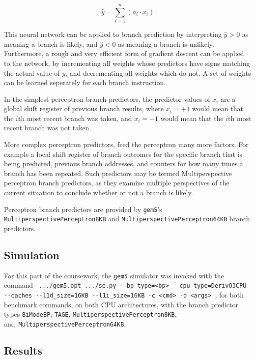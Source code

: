 \begin{equation}
    \hat{y} = \sum_{i=1}^{n} \left( a_i \cdot x_i \right)
    \label{eq:perceptron}
\end{equation}

This neural network can be applied to branch prediction by interpreting
\(\hat{y} > 0\) as meaning a branch is likely, and \(\hat{y} < 0\) as meaning
a branch is unlikely. 
Furthermore, a rough and very efficient form of gradient
descent can be applied to the network, by incrementing all weights whose predictors
have signs matching the actual value of \(y\), and decrementing all weights which
do not. 
A set of weights can be learned seperately for each branch 
instruction.~\cite{Jimenez2001}

In the simplest perceptron branch predictors, the predictor values of \(x_i\)
are a global shift register of previous branch results, where \(x_i = +1\) would
mean that the \(i\)th most recent branch was taken, and \(x_i = -1\) would
mean that the \(i\)th most recent branch was not taken.

More complex perceptron predictors, feed the perceptron many more
factors. For example a local shift register of branch outcomes for the specific
branch that is being predicted, previous branch addresses, and counters for
how many times a branch has been repeated.
Such predictors may be termed
Multiperspective perceptron branch predictors, as they examine multiple
perspectives of the current situation to conclude whether or not a branch
is likely.

Perceptron branch predictors are provided by \texttt{gem5}'s \texttt{MultiperspectivePerceptron8KB}
and \texttt{MultiperspectivePerceptron64KB} branch predictors.


\subsection{Simulation}

For this part of the coursework, the \texttt{gem5} simulator was invoked with the
command \texttt{
    .../gem5.opt~.../se.py
    -{}-bp-type=<bp>
    -{}-cpu-type=DerivO3CPU
    -{}-caches
    -{}-l1d\_size=16KB
    -{}-l1i\_size=16KB
    -c~<cmd>
    -o~<args>
}, for both benchmark commands, on both CPU architectures, with the branch
predictor types \texttt{BiModeBP}, \texttt{TAGE},
\texttt{MultiperspectivePerceptron8KB},
and~\texttt{MultiperspectivePerceptron64KB}.

\subsection{Results}

